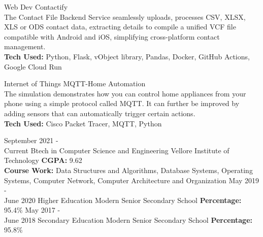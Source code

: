 \documentclass[9pt]{developercv}
\begin{document}
\begin{entrylist}
  \entry
  {Web Dev}
  {Contactify}
  {\\}
  {The Contact File Backend Service seamlessly uploads, processes CSV, XLSX, XLS or ODS contact data,   extracting
    details to compile a unified VCF file compatible with Android and iOS, simplifying cross-platform contact management.\\
    \textbf{Tech Used: } Python, Flask, vObject library, Pandas, Docker, GitHub Actions, Google Cloud Run
  }

  \entry
  {Internet of Things}
  {MQTT-Home Automation}
  {\\}
  {The simulation demonstrates how you can control home appliances from your phone using a simple protocol called MQTT. It can further be improved by adding sensors that can automatically trigger certain actions.\\
    \textbf{Tech Used: } Cisco Packet Tracer, MQTT, Python
  }

\end{entrylist}

\vspace{-10 pt}
\begin{entrylist}
  \entry
  {September 2021 - \\ Current}
  {Btech in Computer Science and Engineering}
  {Vellore Institute of Technology}
  {\textbf{CGPA: }9.62\\
    \textbf{Course Work: }Data Structures and Algorithms, Database Systems, Operating Systems, Computer Network, Computer
    Architecture and Organization
  }
  \entry
  {May 2019 - \\ June 2020}
  {Higher Education}
  {Modern Senior Secondary School}
  {\textbf{Percentage: }95.4\%}
  \entry
  {May 2017 - \\ June 2018}
  {Secondary Education}
  {Modern Senior Secondary School}
  {\textbf{Percentage: }95.8\%}
\end{entrylist}
\end{document}
